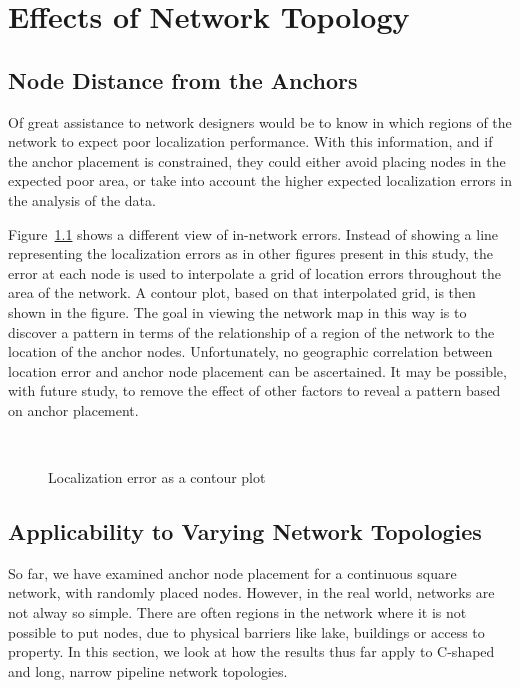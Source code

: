 \chapter{Effects of Network Topology}

\section{Node Distance from the Anchors}

Of great assistance to network designers would be to know in which regions of the network to expect poor localization performance.  With this information, and if the anchor placement is constrained, they could either avoid placing nodes in the expected poor area, or take into account the higher expected localization errors in the analysis of the data.

Figure~\ref{fig:AS6goodcontour} shows a different view of in-network errors. Instead of showing a line representing the localization errors as in other figures present in this study, the error at each node is used to interpolate a grid of location errors throughout the area of the network.  A contour plot, based on that interpolated grid, is then shown in the figure.  The goal in viewing the network map in this way is to discover a pattern in terms of the relationship of a region of the network to the location of the anchor nodes.  Unfortunately, no geographic correlation between location error and anchor node placement can be ascertained.  It may be possible, with future study, to remove the effect of other factors to reveal a pattern based on anchor placement.

\begin{figure}
  \centering
	\\
	\caption{Localization error as a contour plot}
	\label{fig:AS6goodcontour}
\end{figure}

\section{Applicability to Varying Network Topologies}

So far, we have examined anchor node placement for a continuous square network, with randomly placed nodes.  However, in the real world, networks are not alway so simple.  There are often regions in the network where it is not possible to put nodes, due to physical barriers like lake, buildings or access to property.  In this section, we look at how the results thus far apply to C-shaped and long, narrow pipeline network topologies.

